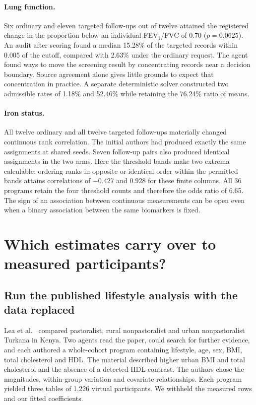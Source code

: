 \documentclass[sigconf,anonymous,review]{acmart}
\begin{document}
\paragraph{Lung function.}
Six ordinary and eleven targeted follow-ups out of twelve attained the registered change in the proportion below an individual FEV$_1$/FVC of 0.70 ($p=0.0625$). An audit after scoring found a median 15.28\% of the targeted records within 0.005 of the cutoff, compared with 2.63\% under the ordinary request. The agent found ways to move the screening result by concentrating records near a decision boundary. Source agreement alone gives little grounds to expect that concentration in practice. A separate deterministic solver constructed two admissible rates of 1.18\% and 52.46\% while retaining the 76.24\% ratio of means.

\paragraph{Iron status.}
All twelve ordinary and all twelve targeted follow-ups materially changed continuous rank correlation. The initial authors had produced exactly the same assignments at shared seeds. Seven follow-up pairs also produced identical assignments in the two arms. Here the threshold bands make two extrema calculable: ordering ranks in opposite or identical order within the permitted bands attains correlations of $-0.427$ and $0.928$ for these finite columns. All 36 programs retain the four threshold counts and therefore the odds ratio of 6.65. The sign of an association between continuous measurements can be open even when a binary association between the same biomarkers is fixed.

\section{Which estimates carry over to measured participants?}
\label{sec:lifestyle}
\subsection{Run the published lifestyle analysis with the data replaced}
Lea et al.~\cite{lea,leadata} compared pastoralist, rural nonpastoralist and urban nonpastoralist Turkana in Kenya. Two agents read the paper, could search for further evidence, and each authored a whole-cohort program containing lifestyle, age, sex, BMI, total cholesterol and HDL. The material described higher urban BMI and total cholesterol and the absence of a detected HDL contrast. The authors chose the magnitudes, within-group variation and covariate relationships. Each program yielded three tables of 1,226 virtual participants. We withheld the measured rows and our fitted coefficients.
\end{document}
